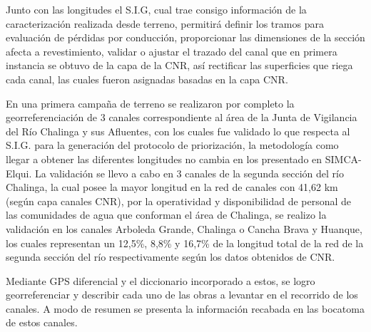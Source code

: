 \documentclass[]{article}
\begin{document}
Junto con las longitudes el S.I.G, cual trae consigo información de la caracterización realizada desde terreno, permitirá definir los tramos para evaluación de pérdidas por conducción, proporcionar las dimensiones de la sección afecta a revestimiento, validar o ajustar el trazado del canal que en primera instancia se obtuvo de la capa de la CNR, así rectificar las superficies que riega cada canal, las cuales fueron asignadas basadas en la capa CNR. 

En una primera campaña de terreno se realizaron por completo la georreferenciación de 3 canales correspondiente al área de la Junta de Vigilancia del Río Chalinga y sus Afluentes, con los cuales fue validado lo que respecta al S.I.G. para la generación del protocolo de priorización, la metodología como llegar a obtener las diferentes longitudes no cambia en los presentado en SIMCA-Elqui. La validación se llevo a cabo en 3 canales de la segunda sección del río Chalinga, la cual posee la mayor longitud en la red de canales con 41,62 km (según capa canales CNR), por la operatividad y disponibilidad de personal de las comunidades de agua que conforman el área de Chalinga, se realizo la validación en los canales Arboleda Grande, Chalinga o Cancha Brava y Huanque, los cuales representan un 12,5\%, 8,8\% y 16,7\% de la longitud total de la red de la segunda sección del río respectivamente según los datos obtenidos de CNR.

Mediante GPS diferencial y el diccionario incorporado a estos, se logro georreferenciar y describir cada uno de las obras a levantar en el recorrido de los canales. A modo de resumen se presenta la información recabada en las bocatoma de estos canales.
\end{document}
